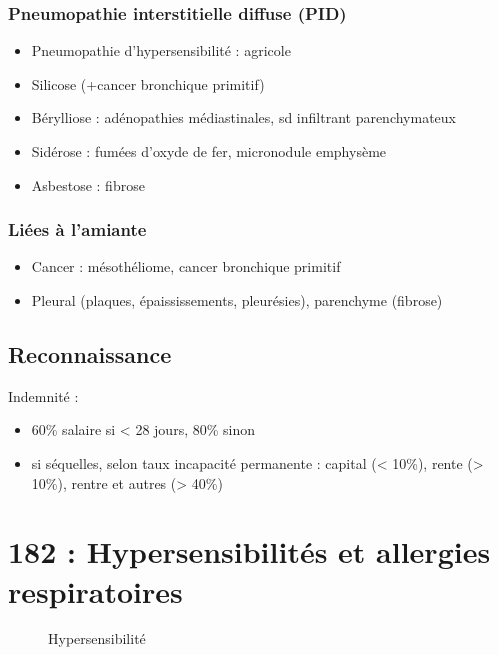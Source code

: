 \documentclass{article}
\begin{document}
\subsubsection{Pneumopathie interstitielle diffuse (PID)}
\begin{itemize}
\item Pneumopathie d'hypersensibilité : agricole
\item Silicose (+cancer bronchique primitif)
\item Bérylliose : adénopathies médiastinales, sd infiltrant parenchymateux
\item Sidérose : fumées d'oxyde de fer, micronodule \textpm{} emphysème
\item Asbestose : fibrose
\end{itemize}
\subsubsection{Liées à l'amiante}
\begin{itemize}
\item Cancer : mésothéliome, cancer bronchique primitif
\item Pleural (plaques, épaississements, pleurésies), parenchyme (fibrose)
\end{itemize}
\subsection{Reconnaissance}
Indemnité : 
\begin{itemize}
\item 60\% salaire si < 28 jours, 80\% sinon
\item si séquelles, selon taux incapacité permanente : capital (< 10\%), rente
  (> 10\%), rentre et autres (> 40\%)
\end{itemize}

\section{182 : Hypersensibilités et allergies respiratoires}%
\label{sec:182_hypersensibilites_et_allergies_respiratoires}

\begin{figure}[htpb]
  \centering
  \caption{Hypersensibilité}
\end{figure}
\end{document}
